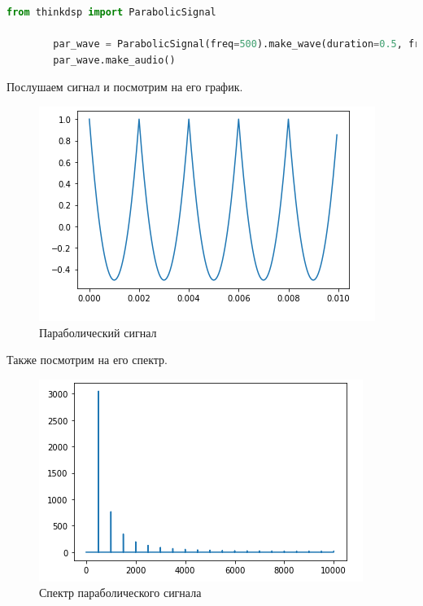 \documentclass[a4paper, 14pt]{extarticle}
\begin{document}
    \begin{lstlisting}[language=Python, caption= Получение параболического сигнала используя ParabolicSignal, label={lst:par_signal_make}]
        from thinkdsp import ParabolicSignal

        par_wave = ParabolicSignal(freq=500).make_wave(duration=0.5, framerate=20000)
        par_wave.make_audio()
    \end{lstlisting}

    Послушаем сигнал и посмотрим на его график.

    \begin{figure}[H]
        \centering
        \includegraphics[width=\textwidth]{par_signal}
        \caption{Параболический сигнал}
        \label{fig:par_signal}
    \end{figure}

    Также посмотрим на его спектр.

    \begin{figure}[H]
        \centering
        \includegraphics[width=\textwidth]{par_spectrum}
        \caption{Спектр параболического сигнала}
        \label{fig:par_spectrum}
    \end{figure}
\end{document}
